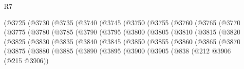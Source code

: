 \begin{lexlean}{R7}
\begin{coremodule}
                (@3725
                  (@3730
                    (@3735
                      (@3740
                        (@3745
                          (@3750
                            (@3755
                              (@3760
                                (@3765
                                  (@3770
                                    (@3775
                                      (@3780
                                        (@3785
                                          (@3790
                                            (@3795
                                              (@3800
                                                (@3805
                                                  (@3810
                                                    (@3815
                                                      (@3820
                                                        (@3825
                                                          (@3830
                                                            (@3835
                                                              (@3840
                                                                (@3845
                                                                  (@3850
                                                                    (@3855
                                                                      (@3860
                                                                        (@3865
                                                                          (@3870
                                                                            (@3875
                                                                              (@3880
                                                                                (@3885
                                                                                  (@3890
                                                                                    (@3895
                                                                                      (@3900
                                                                                        (@3905
                                                                                          (@838
                                                                                            (@212
                                                                                              @3906
                                                                                              (@215
                                                                                                @3906))

\end{coremodule}
\end{lexlean}

